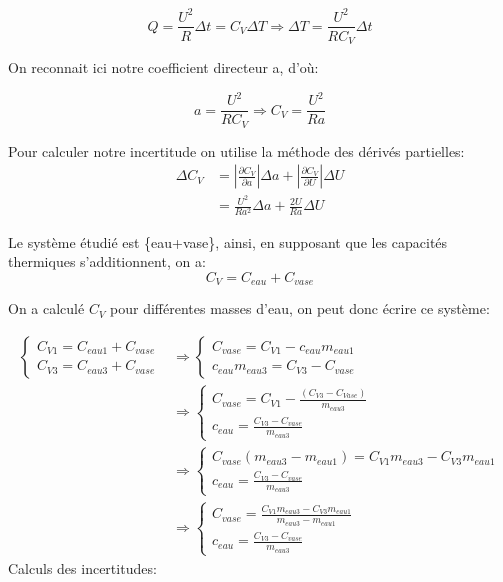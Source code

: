 \documentclass[12pt]{article}
\begin{document}
	\begin{equation}
Q=\frac{U^2}{R}\Delta t = C_V \Delta T 
\Rightarrow \Delta T =\frac{U^2}{RC_V}\Delta t
	\end{equation}

On reconnait ici notre coefficient directeur a, d'où:

\begin{equation}
a=\frac{U^2}{RC_V} \Rightarrow C_V=\frac{U^2}{Ra}
\end{equation}	

Pour calculer notre incertitude on utilise la méthode des dérivés partielles:
\begin{align*}
\Delta C_V &=\displaystyle\left\lvert \frac{\partial C_V}{\partial a}\right\rvert \Delta a + \displaystyle\left\lvert  \frac{\partial C_V}{\partial U}\right\rvert \Delta U \\
&=\frac{U^2}{Ra^2}\Delta a +\frac{2U}{Ra}\Delta U
\end{align*}

Le système étudié est \{eau+vase\}, ainsi, en supposant que les capacités thermiques s'additionnent, on a:
\begin{equation}
C_V=C_{eau}+C_{vase}
\end{equation}

\newpage
On a calculé $C_V$ pour différentes masses d'eau, on peut donc écrire ce système:

\begin{equation}
	\begin{split}
		\begin{cases}
			C_{V1}=C_{eau1}+C_{vase} \\
			C_{V3}=C_{eau3}+C_{vase}
		\end{cases} 
&\Rightarrow 
		\begin{cases}
			C_{vase}=C_{V1}-c_{eau}m_{eau1} \\
			c_{eau}m_{eau3}=C_{V3}-C_{vase}
		\end{cases} \\
&\Rightarrow 
		\begin{cases}
			C_{vase}=C_{V1}-\frac{(C_{V3}-C_{Vase})}{m_{eau3}} \\
			c_{eau}=\frac{C_{V3}-C_{vase}}{m_{eau3}}
		\end{cases} \\
&\Rightarrow 
		\begin{cases}
			C_{vase}(m_{eau3}-m_{eau1})=C_{V1}m_{eau3}-C_{V3}m_{eau1} \\
			c_{eau}=\frac{C_{V3}-C_{vase}}{m_{eau3}}
		\end{cases} \\
&\Rightarrow 		
		\begin{cases}
			C_{vase}=\frac{C_{V1}m_{eau3}-C_{V3}m_{eau1}}{m_{eau3}-m_{eau1}}  \\
			c_{eau}=\frac{C_{V3}-C_{vase}}{m_{eau3}}
		\end{cases}
	\end{split}	
\end{equation}
Calculs des incertitudes:
\end{document}
